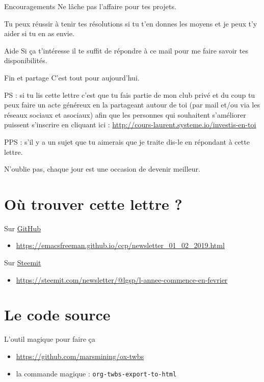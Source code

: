 \documentclass[presentation]{beamer}
\begin{document}
\begin{frame}[label={sec:org52e2fe5}]{Encouragements}
Ne lâche pas l'affaire pour tes projets. 



Tu peux réussir à tenir tes résolutions si tu t'en donnes les
moyens et je peux t'y aider si tu en as envie. 
\end{frame}




\begin{frame}[label={sec:org3d76998}]{Aide}
Si ça t'intéresse il te suffit de répondre à ce mail pour me faire
savoir tes disponibilités. 
\end{frame}





\begin{frame}[label={sec:org60a7296}]{Fin et partage}
C'est tout pour aujourd'hui.



PS : si tu lis cette lettre c'est que tu fais partie de mon club privé
et du coup tu peux faire un acte généreux en la partageant autour de
toi (par mail et/ou via les réseaux sociaux et asociaux) afin que les
personnes qui souhaitent s'améliorer puissent s'inscrire en cliquant
ici : \url{http://cours-laurent.systeme.io/investis-en-toi}


PPS : s'il y a un sujet que tu aimerais que je traite dis-le en
répondant à cette lettre.




N'oublie pas, chaque jour est une occasion de devenir meilleur.
\end{frame}

\section{Où trouver cette lettre ?}
\label{sec:org655c124}
\begin{frame}[label={sec:org5afad38}]{Sur \href{https://emacsfreeman.github.io/ccp/newsletter\_01\_02\_2019.html}{GitHub}}
\begin{itemize}
\item \url{https://emacsfreeman.github.io/ccp/newsletter\_01\_02\_2019.html}
\end{itemize}
\end{frame}
\begin{frame}[label={sec:org8be535e}]{Sur \href{https://steemit.com/newsletter/@lgsp/l-annee-commence-en-fevrier}{Steemit}}
\begin{itemize}
\item \url{https://steemit.com/newsletter/@lgsp/l-annee-commence-en-fevrier}
\end{itemize}
\end{frame}
\section{Le code source}
\label{sec:org8798df9}
\begin{frame}[fragile,label={sec:orgbec1649}]{L'outil magique pour faire ça}
 \begin{itemize}
\item \url{https://github.com/marsmining/ox-twbs}
\item la commande magique : \texttt{org-twbs-export-to-html}
\end{itemize}
\end{frame}
\end{document}
